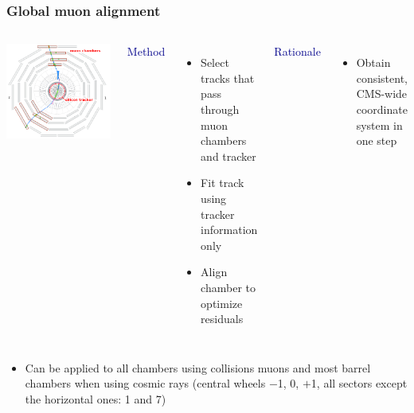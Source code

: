 \documentclass[compress]{beamer}
\begin{document}
\begin{frame}
\frametitle{Global muon alignment}

\vspace{0.5 cm}
\begin{columns}
\includegraphics[width=\linewidth]{event_display.png}

\hspace{-0.83 cm} \textcolor{darkblue}{\large Method}

\begin{itemize}
\item Select tracks that pass through muon chambers and tracker
\item Fit track using tracker information only
\item Align chamber to optimize residuals
\end{itemize}

\vfill
\hspace{-0.83 cm} \textcolor{darkblue}{\large Rationale}
\begin{itemize}
\item Obtain consistent, CMS-wide coordinate system in one step
\end{itemize}
\end{columns}

\vspace{0.25 cm}
\begin{itemize}
\item Can be applied to all chambers using collisions muons and most barrel chambers when using cosmic rays (central wheels $-$1, 0, $+$1, all sectors except the horizontal ones: 1 and 7)
\end{itemize}
\end{frame}
\end{document}
